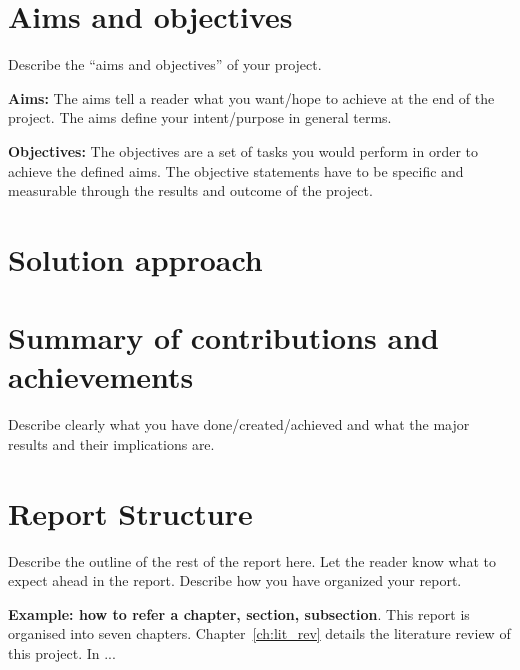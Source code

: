 \section{Aims and objectives}
\label{sec:intro_aims_obj}
Describe the ``aims and objectives'' of your project. 

\textbf{Aims:} The aims tell a reader what you want/hope to achieve at the end of the project. The  aims define your intent/purpose in general terms.  

\textbf{Objectives:} The objectives are a set of tasks you would perform in order to achieve the defined aims. The objective statements have to be specific and measurable through the results and outcome of the project.

\section{Solution approach}
\label{sec:intro_sol}

\section{Summary of contributions and achievements}
\label{sec:intro_sum_results}
Describe clearly what you have done/created/achieved and what the major results and their implications are. 


\section{Report Structure}
\label{sec:intro_org}
Describe the outline of the rest of the report here. Let the reader know what to expect ahead in the report. Describe how you have organized your report. 

\textbf{Example: how to refer a chapter, section, subsection}. This report is organised into seven chapters. Chapter~\ref{ch:lit_rev} details the literature review of this project. In ...  %


